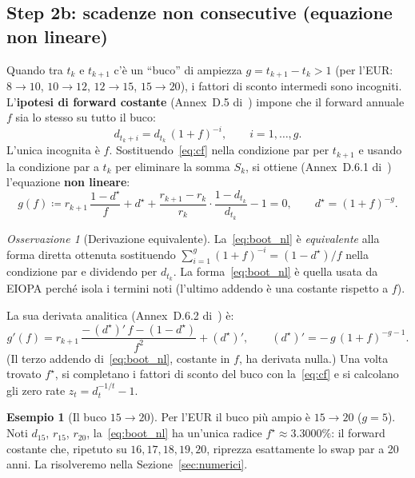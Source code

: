 \documentclass[11pt,a4paper]{article}
\theoremstyle{plain}
\theoremstyle{definition}
\newtheorem{esempio}[teorema]{Esempio}
\theoremstyle{remark}
\newtheorem*{osservazione}{Osservazione}
\newcommand{\defeq}{\coloneqq}
\begin{document}
\subsection{Step 2b: scadenze non consecutive (equazione non lineare)}
\label{sec:step2_nonlin}

Quando tra $t_k$ e $t_{k+1}$ c'\`e un ``buco'' di ampiezza $g = t_{k+1}-t_k > 1$ (per
l'EUR: $8\!\to\!10$, $10\!\to\!12$, $12\!\to\!15$, $15\!\to\!20$), i fattori di sconto
intermedi sono incogniti. L'\textbf{ipotesi di forward costante} (Annex~D.5
di~\cite{eiopa2026}) impone che il forward annuale $f$ sia lo stesso su tutto il buco:
\begin{equation}
  \label{eq:cf}
  d_{t_k+i} = d_{t_k}\,(1+f)^{-i}, \qquad i = 1,\ldots,g.
\end{equation}
L'unica incognita \`e $f$. Sostituendo~\eqref{eq:cf} nella condizione par per
$t_{k+1}$ e usando la condizione par a $t_k$ per eliminare la somma $S_k$, si ottiene
(Annex~D.6.1 di~\cite{eiopa2026}) l'equazione \textbf{non lineare}:
\begin{equation}
  \label{eq:boot_nl}
  g(f) \defeq r_{k+1}\,\frac{1 - d^\star}{f}
            + d^\star
            + \frac{r_{k+1} - r_k}{r_k}\cdot\frac{1 - d_{t_k}}{d_{t_k}}
            - 1 = 0,
  \qquad d^\star = (1+f)^{-g}.
\end{equation}

\begin{osservazione}[Derivazione equivalente]
La~\eqref{eq:boot_nl} \`e \emph{equivalente} alla forma diretta ottenuta sostituendo
$\sum_{i=1}^{g}(1+f)^{-i} = (1-d^\star)/f$ nella condizione par e dividendo per
$d_{t_k}$. La forma~\eqref{eq:boot_nl} \`e quella usata da EIOPA perch\'e isola i
termini noti (l'ultimo addendo \`e una costante rispetto a $f$).
\end{osservazione}

La sua derivata analitica (Annex~D.6.2 di~\cite{eiopa2026}) \`e:
\begin{equation}
  \label{eq:boot_nl_der}
  g'(f) = r_{k+1}\,\frac{-\,(d^\star)'\,f - (1 - d^\star)}{f^2} + (d^\star)',
  \qquad (d^\star)' = -\,g\,(1+f)^{-g-1}.
\end{equation}
(Il terzo addendo di~\eqref{eq:boot_nl}, costante in $f$, ha derivata nulla.)
Una volta trovato $f^\star$, si completano i fattori di sconto del buco con
la~\eqref{eq:cf} e si calcolano gli zero rate $z_t = d_t^{-1/t}-1$.

\begin{esempio}[Il buco $15\!\to\!20$]
\label{ex:gap}
Per l'EUR il buco pi\`u ampio \`e $15\!\to\!20$ ($g=5$). Noti $d_{15}$, $r_{15}$, $r_{20}$,
la~\eqref{eq:boot_nl} ha un'unica radice $f^\star \approx 3.3000\%$: il forward costante
che, ripetuto su $16,17,18,19,20$, riprezza esattamente lo swap par a 20 anni. La
risolveremo nella Sezione~\ref{sec:numerici}.
\end{esempio}
\end{document}
